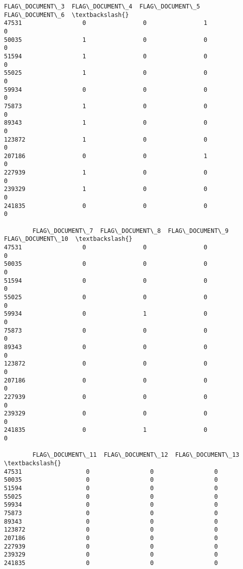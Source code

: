 \documentclass[11pt]{article}
\begin{document}
\begin{tcolorbox}[breakable, size=fbox, boxrule=.5pt, pad at break*=1mm, opacityfill=0]
\begin{Verbatim}[commandchars=\\\{\}]
        FLAG\_DOCUMENT\_3  FLAG\_DOCUMENT\_4  FLAG\_DOCUMENT\_5  FLAG\_DOCUMENT\_6  \textbackslash{}
47531                 0                0                1                0
50035                 1                0                0                0
51594                 1                0                0                0
55025                 1                0                0                0
59934                 0                0                0                0
75873                 1                0                0                0
89343                 1                0                0                0
123872                1                0                0                0
207186                0                0                1                0
227939                1                0                0                0
239329                1                0                0                0
241835                0                0                0                0

        FLAG\_DOCUMENT\_7  FLAG\_DOCUMENT\_8  FLAG\_DOCUMENT\_9  FLAG\_DOCUMENT\_10  \textbackslash{}
47531                 0                0                0                 0
50035                 0                0                0                 0
51594                 0                0                0                 0
55025                 0                0                0                 0
59934                 0                1                0                 0
75873                 0                0                0                 0
89343                 0                0                0                 0
123872                0                0                0                 0
207186                0                0                0                 0
227939                0                0                0                 0
239329                0                0                0                 0
241835                0                1                0                 0

        FLAG\_DOCUMENT\_11  FLAG\_DOCUMENT\_12  FLAG\_DOCUMENT\_13  \textbackslash{}
47531                  0                 0                 0
50035                  0                 0                 0
51594                  0                 0                 0
55025                  0                 0                 0
59934                  0                 0                 0
75873                  0                 0                 0
89343                  0                 0                 0
123872                 0                 0                 0
207186                 0                 0                 0
227939                 0                 0                 0
239329                 0                 0                 0
241835                 0                 0                 0


\end{Verbatim}
\end{tcolorbox}
\end{document}

